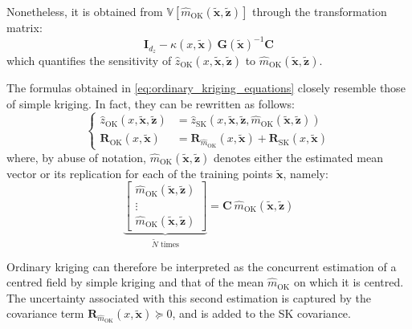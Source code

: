 Nonetheless, it is obtained from $\mathbb{V}\left[\hat{m}_{\mathrm{OK}}(\tilde{\mathbf{x}},\tilde{\mathbf{z}})\right]$ through the transformation matrix:
\begin{equation}
	\mathbf{I}_{d_z}-\kappa(x,\tilde{\mathbf{x}})\:\mathbf{G}(\tilde{\mathbf{x}})^{-1}\mathbf{C}
\end{equation}
which quantifies the sensitivity of $\hat{z}_{\mathrm{OK}}(x,\tilde{\mathbf{x}},\tilde{\mathbf{z}})$ to $\hat{m}_{\mathrm{OK}}(\tilde{\mathbf{x}},\tilde{\mathbf{z}})$.

\begin{remark}\label{th:ordinary_simple_kriging_link}
	The formulas obtained in \eqref{eq:ordinary_kriging_equations} closely resemble those of simple kriging. In fact, they can be rewritten as follows:
	\begin{equation}
		\left\{\begin{aligned}
		\hat{z}_{\mathrm{OK}}(x,\tilde{\mathbf{x}},\tilde{\mathbf{z}})&=\hat{z}_{\mathrm{SK}}(x,\tilde{\mathbf{x}},\tilde{\mathbf{z}},\hat{m}_{\mathrm{OK}}(\tilde{\mathbf{x}},\tilde{\mathbf{z}}))\\
		\mathbf{R}_{\mathrm{OK}}(x,\tilde{\mathbf{x}})&=\mathbf{R}_{\hat{m}_{\mathrm{OK}}}(x,\tilde{\mathbf{x}})+\mathbf{R}_{\mathrm{SK}}(x,\tilde{\mathbf{x}})
		\end{aligned}\right.
	\end{equation}
	where, by abuse of notation, $\hat{m}_{\mathrm{OK}}(\tilde{\mathbf{x}},\tilde{\mathbf{z}})$ denotes either the estimated mean vector or its replication for each of the training points $\tilde{\mathbf{x}}$, namely:
	\begin{equation}
		\underbrace{\begin{bmatrix}
		\hat{m}_{\mathrm{OK}}(\tilde{\mathbf{x}},\tilde{\mathbf{z}})\\\vdots\\\hat{m}_{\mathrm{OK}}(\tilde{\mathbf{x}},\tilde{\mathbf{z}})
		\end{bmatrix}}_{\tilde{N}\text{ times}}=\mathbf{C}\:\hat{m}_{\mathrm{OK}}(\tilde{\mathbf{x}},\tilde{\mathbf{z}})
	\end{equation}

	Ordinary kriging can therefore be interpreted as the concurrent estimation of a centred field by simple kriging and that of the mean $\hat{m}_{\mathrm{OK}}$ on which it is centred. The uncertainty associated with this second estimation is captured by the covariance term $\mathbf{R}_{\hat{m}_{\mathrm{OK}}}(x,\tilde{\mathbf{x}})\succeq0$, and is added to the SK covariance.
\end{remark}

